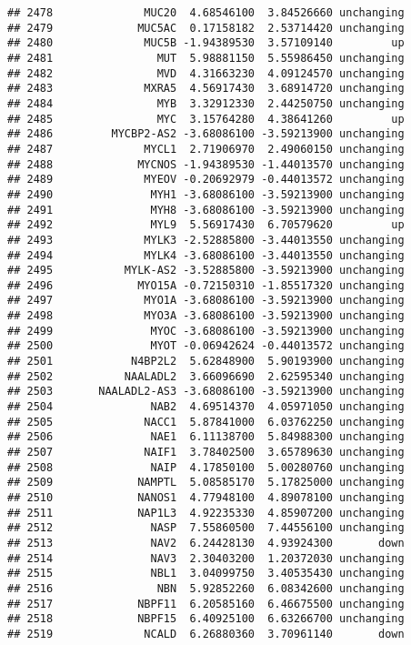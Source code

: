 \documentclass[]{article}
\begin{document}
\begin{verbatim}
## 2478              MUC20  4.68546100  3.84526660 unchanging
## 2479             MUC5AC  0.17158182  2.53714420 unchanging
## 2480              MUC5B -1.94389530  3.57109140         up
## 2481                MUT  5.98881150  5.55986450 unchanging
## 2482                MVD  4.31663230  4.09124570 unchanging
## 2483              MXRA5  4.56917430  3.68914720 unchanging
## 2484                MYB  3.32912330  2.44250750 unchanging
## 2485                MYC  3.15764280  4.38641260         up
## 2486         MYCBP2-AS2 -3.68086100 -3.59213900 unchanging
## 2487              MYCL1  2.71906970  2.49060150 unchanging
## 2488             MYCNOS -1.94389530 -1.44013570 unchanging
## 2489              MYEOV -0.20692979 -0.44013572 unchanging
## 2490               MYH1 -3.68086100 -3.59213900 unchanging
## 2491               MYH8 -3.68086100 -3.59213900 unchanging
## 2492               MYL9  5.56917430  6.70579620         up
## 2493              MYLK3 -2.52885800 -3.44013550 unchanging
## 2494              MYLK4 -3.68086100 -3.44013550 unchanging
## 2495           MYLK-AS2 -3.52885800 -3.59213900 unchanging
## 2496             MYO15A -0.72150310 -1.85517320 unchanging
## 2497              MYO1A -3.68086100 -3.59213900 unchanging
## 2498              MYO3A -3.68086100 -3.59213900 unchanging
## 2499               MYOC -3.68086100 -3.59213900 unchanging
## 2500               MYOT -0.06942624 -0.44013572 unchanging
## 2501            N4BP2L2  5.62848900  5.90193900 unchanging
## 2502           NAALADL2  3.66096690  2.62595340 unchanging
## 2503       NAALADL2-AS3 -3.68086100 -3.59213900 unchanging
## 2504               NAB2  4.69514370  4.05971050 unchanging
## 2505              NACC1  5.87841000  6.03762250 unchanging
## 2506               NAE1  6.11138700  5.84988300 unchanging
## 2507              NAIF1  3.78402500  3.65789630 unchanging
## 2508               NAIP  4.17850100  5.00280760 unchanging
## 2509             NAMPTL  5.08585170  5.17825000 unchanging
## 2510             NANOS1  4.77948100  4.89078100 unchanging
## 2511             NAP1L3  4.92235330  4.85907200 unchanging
## 2512               NASP  7.55860500  7.44556100 unchanging
## 2513               NAV2  6.24428130  4.93924300       down
## 2514               NAV3  2.30403200  1.20372030 unchanging
## 2515               NBL1  3.04099750  3.40535430 unchanging
## 2516                NBN  5.92852260  6.08342600 unchanging
## 2517             NBPF11  6.20585160  6.46675500 unchanging
## 2518             NBPF15  6.40925100  6.63266700 unchanging
## 2519              NCALD  6.26880360  3.70961140       down

\end{verbatim}
\end{document}
